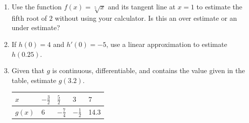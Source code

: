 \documentclass[12pt]{article}
\begin{document}
\begin{enumerate}
\begin{enumerate}
	\item How good is the linear approximation at estimating the actual value of the function?
	\vfill
		
	\end{enumerate}

\newpage

$\hspace{10px}$ \\

\begin{tcolorbox}
\textbf{Definition:} The error is the difference between the actual value (given by $f$), and the approximate value (given by $L$), with equation

$$E(x) = f(x) - L(x) = $$

For a nicely behaved function,

$$E(x) \approx \frac{f''(a)}{2} (x-a)^2$$
\end{tcolorbox}

\item Use the function $f(x) = \sqrt[5]{x}$ and its tangent line at $x=1$ to estimate the fifth root of $2$ without using your calculator. Is this an over estimate or an under estimate?
\vfill

\item If $h(0) = 4$ and $h'(0) = -5$, use a linear approximation to estimate $h(0.25)$.
\vfill

\item Given that $g$ is continuous, differentiable, and contains the value given in the table, estimate $g(3.2)$.

		\begin{tabular}{l||l|l|l|l}
		$x$ & $-\frac{3}{2}$ & $\frac{5}{2}$ & $3$ & $7$ \\ \hline
		$g(x)$   & $6$    &  $-\frac{7}{4}$   & $-\frac{1}{2}$ & 14.3                  \\     
		\end{tabular}
\vfill

\end{enumerate}
\end{document}

